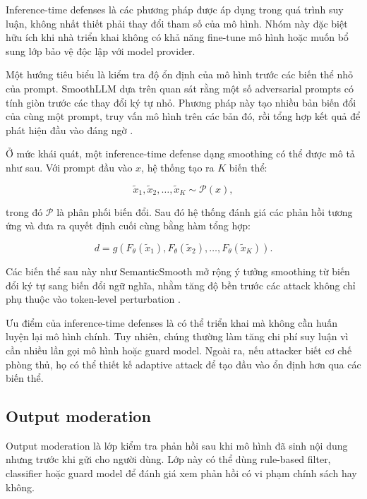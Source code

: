 Inference-time defenses là các phương pháp được áp dụng trong quá trình
suy luận, không nhất thiết phải thay đổi tham số của mô hình. Nhóm này
đặc biệt hữu ích khi nhà triển khai không có khả năng fine-tune mô hình
hoặc muốn bổ sung lớp bảo vệ độc lập với model provider.

Một hướng tiêu biểu là kiểm tra độ ổn định của mô hình trước các biến thể
nhỏ của prompt. SmoothLLM dựa trên quan sát rằng một số adversarial prompts
có tính giòn trước các thay đổi ký tự nhỏ. Phương pháp này tạo nhiều bản
biến đổi của cùng một prompt, truy vấn mô hình trên các bản đó, rồi tổng
hợp kết quả để phát hiện đầu vào đáng ngờ \cite{robey2023smoothllm}.

Ở mức khái quát, một inference-time defense dạng smoothing có thể được mô
tả như sau. Với prompt đầu vào $x$, hệ thống tạo ra $K$ biến thể:

\begin{equation}
    \tilde{x}_1, \tilde{x}_2, \ldots, \tilde{x}_K
    \sim
    \mathcal{P}(x),
    \label{eq:prompt-perturbation}
\end{equation}

trong đó $\mathcal{P}$ là phân phối biến đổi. Sau đó hệ thống đánh giá các
phản hồi tương ứng và đưa ra quyết định cuối cùng bằng hàm tổng hợp:

\begin{equation}
    d
    =
    g
    \left(
        F_{\theta}(\tilde{x}_1),
        F_{\theta}(\tilde{x}_2),
        \ldots,
        F_{\theta}(\tilde{x}_K)
    \right).
    \label{eq:smoothing-aggregation}
\end{equation}

Các biến thể sau này như SemanticSmooth mở rộng ý tưởng smoothing từ biến
đổi ký tự sang biến đổi ngữ nghĩa, nhằm tăng độ bền trước các attack không
chỉ phụ thuộc vào token-level perturbation \cite{ji2024semanticsmooth}.

Ưu điểm của inference-time defenses là có thể triển khai mà không cần huấn
luyện lại mô hình chính. Tuy nhiên, chúng thường làm tăng chi phí suy luận
vì cần nhiều lần gọi mô hình hoặc guard model. Ngoài ra, nếu attacker biết
cơ chế phòng thủ, họ có thể thiết kế adaptive attack để tạo đầu vào ổn định
hơn qua các biến thể.

\subsection{Output moderation}
\label{subsec:output-moderation}

Output moderation là lớp kiểm tra phản hồi sau khi mô hình đã sinh nội
dung nhưng trước khi gửi cho người dùng. Lớp này có thể dùng rule-based
filter, classifier hoặc guard model để đánh giá xem phản hồi có vi phạm
chính sách hay không.

